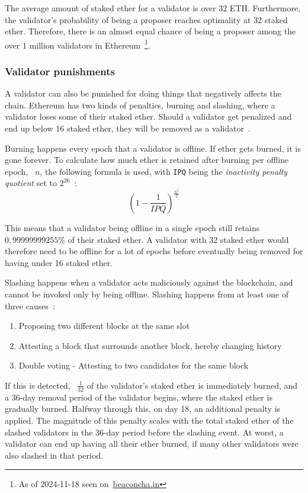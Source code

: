 The average amount of staked ether for a validator is over 32 ETH\@.
Furthermore, the validator's probability of being a proposer reaches optimality at 32 staked ether.
Therefore, there is an almost equal chance of being a proposer among the over 1 million validators in Ethereum~\footnote{As of 2024-11-18 seen on~\href{https://beaconcha.in/}{beaconcha.in}}.

\subsubsection{Validator punishments}\label{subsubsec:valpunish}
A validator can also be punished for doing things that negatively affects the chain.
Ethereum has two kinds of penalties, burning and slashing, where a validator loses some of their staked ether.
Should a validator get penalized and end up below 16 staked ether, they will be removed as a validator~\cite{consensus-spec-phase-0}.


Burning happens every epoch that a validator is offline.
If ether gets burned, it is gone forever.
To calculate how much ether is retained after burning per offline epoch, ~$n$, the following formula is used, with \texttt{IPQ} being the \textit{inactivity penalty quotient} set to $2^{26}$~\cite{consensus-spec-phase-0}:
\begin{equation}
    \left(1-\frac{1}{IPQ}\right)^\frac{n^2}{2}
    \label{eq:burn}
\end{equation}


This means that a validator being offline in a single epoch still retains $0,99999999255\%$ of their staked ether\@.
A validator with 32 staked ether would therefore need
to be offline for a lot of epochs before eventually being removed for having under 16 staked ether\@.


Slashing happens when a validator acts maliciously against the blockchain,
and cannot be invoked only by being offline.
Slashing happens from at least one of three causes~\cite{PoSRewAndPen}:
\begin{enumerate}
    \item Proposing two different blocks at the same slot
    \item Attesting a block that surrounds another block, hereby changing history
    \item Double voting - Attesting to two candidates for the same block
\end{enumerate}
If this is detected, ~$\frac{1}{32}$ of the validator's staked ether is immediately burned,
and a 36-day removal period of the validator begins, where the staked ether is gradually burned.
Halfway through this, on day 18, an additional penalty is applied.
The magnitude of this penalty scales with the total staked ether of the slashed validators in the 36-day period before the slashing event.
At worst, a validator can end up having all their ether burned, if many other validators were also slashed in that period.


